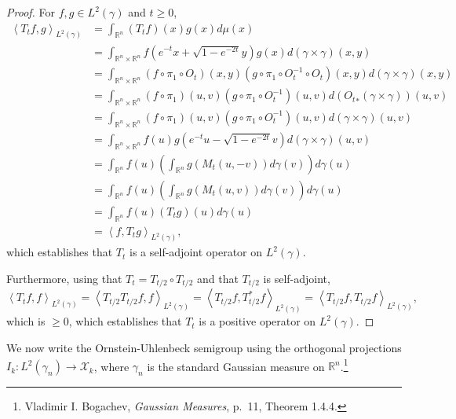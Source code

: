 \documentclass{article}
\newcommand{\inner}[2]{\left\langle #1, #2 \right\rangle}
\theoremstyle{definition}
\begin{document}
\begin{proof}
For $f,g \in L^2(\gamma)$ and $t \geq 0$,
\begin{align*}
\inner{T_t f}{g}_{L^2(\gamma)}&=\int_{\mathbb{R}^n} (T_t f)(x) g(x) d\mu(x)\\
&=\int_{\mathbb{R}^n \times \mathbb{R}^n} f\left(e^{-t}x+\sqrt{1-e^{-2t}}y\right) g(x) d(\gamma \times \gamma)(x,y)\\
&=\int_{\mathbb{R}^n \times \mathbb{R}^n} (f \circ \pi_1 \circ O_t)(x,y) (g \circ \pi_1 \circ O_t^{-1} \circ O_t)(x,y) d(\gamma \times \gamma)(x,y)\\
&=\int_{\mathbb{R}^n \times \mathbb{R}^n} (f \circ \pi_1)(u,v) (g \circ \pi_1 \circ O_t^{-1})(u,v) d({O_t}_* (\gamma \times \gamma))(u,v)\\
&=\int_{\mathbb{R}^n \times \mathbb{R}^n} (f \circ \pi_1)(u,v) (g \circ \pi_1 \circ O_t^{-1})(u,v) d(\gamma \times \gamma)(u,v)\\
&=\int_{\mathbb{R}^n \times \mathbb{R}^n} f(u)g\left(e^{-t}u-\sqrt{1-e^{-2t}}v\right) d(\gamma \times \gamma)(u,v)\\
&=\int_{\mathbb{R}^n} f(u) \left(\int_{\mathbb{R}^n} g(M_t(u,-v)) d\gamma(v) \right) d\gamma(u)\\
&=\int_{\mathbb{R}^n} f(u)  \left(\int_{\mathbb{R}^n} g(M_t(u,v)) d\gamma(v) \right) d\gamma(u)\\
&=\int_{\mathbb{R}^n} f(u) (T_tg)(u) d\gamma(u)\\
&=\inner{f}{T_tg}_{L^2(\gamma)},
\end{align*}
which establishes that $T_t$ is a self-adjoint operator on $L^2(\gamma)$. 

Furthermore, using that $T_t = T_{t/2} \circ T_{t/2}$ and that $T_{t/2}$ is self-adjoint,
\[
\inner{T_t f}{f}_{L^2(\gamma)}
=\inner{T_{t/2} T_{t/2} f}{f}_{L^2(\gamma)}
=\inner{T_{t/2} f}{T_{t/2}^* f}_{L^2(\gamma)}
=\inner{T_{t/2} f}{T_{t/2} f}_{L^2(\gamma)},
\]
which is $\geq 0$, which establishes that $T_t$ is a positive operator on $L^2(\gamma)$.
\end{proof}


We now write the Ornstein-Uhlenbeck semigroup using the orthogonal projections $I_k:L^2(\gamma_n) \to 
\mathcal{X}_k$, where $\gamma_n$ is the standard Gaussian measure on $\mathbb{R}^n$.\footnote{Vladimir I. Bogachev,
{\em Gaussian Measures}, p.~11, Theorem 1.4.4.}
\end{document}
